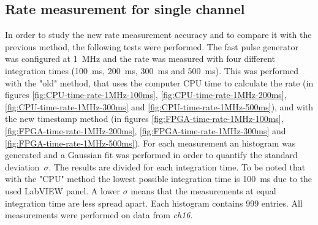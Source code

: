 \subsection{Rate measurement for single channel}\label{RateMeasurements2}
\noindent In order to study the new rate measurement accuracy and to compare it with the previous method, the following tests were performed.
The fast pulse generator was configured at 1~MHz and the rate was measured with four different integration times (100~ms, 200~ms, 300~ms and 500~ms). This was performed with the "old" method, that uses the computer CPU time to calculate the rate (in figures \ref{fig:CPU-time-rate-1MHz-100ms}, \ref{fig:CPU-time-rate-1MHz-200ms}, \ref{fig:CPU-time-rate-1MHz-300ms} and \ref{fig:CPU-time-rate-1MHz-500ms}), and with the new timestamp method (in figures \ref{fig:FPGA-time-rate-1MHz-100ms}, \ref{fig:FPGA-time-rate-1MHz-200ms}, \ref{fig:FPGA-time-rate-1MHz-300ms} and \ref{fig:FPGA-time-rate-1MHz-500ms}). For each measurement an histogram was generated and a Gaussian fit was performed in order to quantify the standard deviation~$\sigma$. 
The results are divided for each integration time.
To be noted that with the "CPU" method the lowest possible integration time is 100~ms due to the used LabVIEW panel.
A lower $\sigma$ means that the measurements at equal integration time are less spread apart.
Each histogram contains 999 entries.
All measurements were performed on data from \textit{ch16}.

